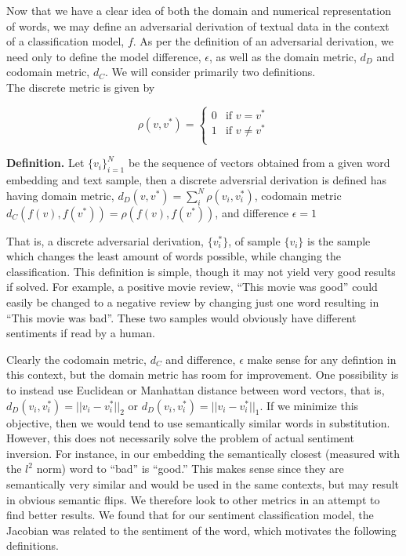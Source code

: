 \noindent
Now that we have a clear idea of both the domain and numerical representation of words, we may define an adversarial derivation of textual data in the context of a classification model, $f$.  As per the definition of an adversarial derivation, we need only to define the model difference, $\epsilon$, as well as the domain metric, $d_D$ and codomain metric, $d_C$.  We will consider primarily two definitions.\\

\noindent
The discrete metric is given by

\[
\rho(v,v^*) =
\begin{cases}
0 & \text{if $v = v^*$} \\
1 & \text{if $v \neq v^*$} \\
\end{cases}
\]

\noindent
\textbf{Definition.} Let $\{v_i\}_{i=1}^N$ be the sequence of vectors obtained from a given word embedding and text sample, then a discrete adversrial derivation is defined has having domain metric, $d_D(v,v^*) = \sum_i^N\rho(v_i,v_i^*)$, codomain metric $d_C(f(v),f(v^*)) = \rho(f(v),f(v^*))$, and difference $\epsilon = 1$

That is, a discrete adversarial derivation, $\{v_i^*\}$, of sample $\{v_i\}$ is the sample which changes the least amount of words possible, while changing the classification.  This definition is simple, though it may not yield very good results if solved.  For example, a positive movie review, ``This movie was good'' could easily be changed to a negative review by changing just one word resulting in ``This movie was bad''.  These two samples would obviously have different sentiments if read by a human.

Clearly the codomain metric, $d_C$ and difference, $\epsilon$ make sense for any defintion in this context, but the domain metric has room for improvement.  One possibility is to instead use Euclidean or Manhattan distance between word vectors, that is, $ d_D(v_i,v_i^*) = ||v_i-v_i^*||_2$ or $d_D(v_i,v_i^*) = ||v_i-v_i^*||_1$.  If we minimize this objective, then we would tend to use semantically similar words in substitution.  However, this does not necessarily solve the problem of actual sentiment inversion.  For instance, in our embedding the semantically closest (measured with the $l^2$ norm) word to ``bad'' is ``good.''  This makes sense since they are semantically very similar and would be used in the same contexts, but may result in obvious semantic flips.  We therefore look to other metrics in an attempt to find better results.  We found that for our sentiment classification model, the Jacobian was related to the sentiment of the word, which motivates the following definitions.\\

